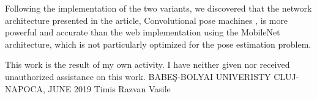 Following the implementation of the two variants, we discovered that the network architecture presented in the article, Convolutional pose machines \cite{DBLP:journals/corr/WeiRKS16}, is more powerful and accurate than the web implementation using the MobileNet architecture, which is not particularly optimized for the pose estimation problem.


This work is the result of my own activity. I have neither given nor
received unauthorized assistance on this work.
\newline\newline
BABEŞ-BOLYAI UNIVERISTY\newline
CLUJ-NAPOCA, JUNE 2019\newline
Timis Razvan Vasile

